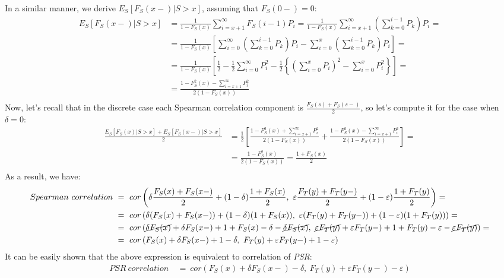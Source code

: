 \documentclass[]{article}
\let\epsilon\varepsilon
\begin{document}
In a similar manner, we derive $E_S[F_S(x-)|S>x]$, assuming that $F_S(0-)=0$:
	$$
	\begin{aligned}
		E_S[F_S(x-)|S>x] &= \frac{1}{1-F_S(x)} \sum_{i=x+1}^{\infty}F_S(i-1)P_i = \frac{1}{1-F_S(x)}\sum_{i=x+1}^{\infty}\left( \sum_{k=0}^{i-1}P_k \right)P_i =\\
		 &= \frac{1}{1-F_S(x)}\left[ \sum_{i=0}^{\infty}\left( \sum_{k=0}^{i-1}P_k \right)P_i - \sum_{i=0}^{x}\left( \sum_{k=0}^{i-1}P_k \right)P_i   \right] = \\
		 &= \frac{1}{1-F_S(x)}\left[ \frac{1}{2} - \frac{1}{2}\sum_{i=0}^{\infty}P_i^2 -  \frac{1}{2} \left\{ \left(\sum_{i=0}^{x}P_i\right)^2 - \sum_{i=0}^{x}P_i^2  \right\}    \right] = \\
		 &= \frac{ 1 - F_S^2(x) - \sum_{i=x+1}^{\infty}P_i^2 }{2(1-F_S(x))}\\
	\end{aligned}
	$$
Now, let's recall that in the discrete case each Spearman correlation component is $\frac{F_S(s) + F_S(s-)}{2}$, so let's compute it for the case when $\delta=0$:
	$$
	\begin{aligned}
	  \frac{E_S[F_S(x)|S>x] + E_S[F_S(x-)|S>x]}{2} &= \frac{1}{2}\left[\frac{ 1 - F_S^2(x) + \sum_{i=x+1}^{\infty}P_i^2 }{2(1-F_S(x))}   +   \frac{ 1 - F_S^2(x) - \sum_{i=x+1}^{\infty}P_i^2 }{2(1-F_S(x))}\right]=\\
		&= \frac{1 - F_S^2(x)}{2(1-F_S(x))}= \frac{1 + F_S(x)}{2}\\
	\end{aligned}
	$$
As a result, we have:
	$$
	\begin{aligned}
		Spearman~correlation~&=~ cor\left(  \delta\frac{F_S(x) + F_S(x-)}{2} + (1-\delta) \frac{1 + F_S(x)}{2}, ~\epsilon\frac{F_T(y) + F_T(y-)}{2} + (1-\epsilon) \frac{1 + F_T(y)}{2} \right)=\\
		&=~ cor\left(  \delta( F_S(x) + F_S(x-)) + (1-\delta) (1 + F_S(x)), ~\epsilon (F_T(y) + F_T(y-)) + (1-\epsilon) (1 + F_T(y)) \right)=\\
		&=~ cor\left( \cancel{\delta F_S(x)} + \delta F_S(x-) +  1 + F_S(x) -\delta - \cancel{\delta F_S(x)}, ~\cancel{\epsilon F_T(y)} + \epsilon F_T(y-) + 1 + F_T(y)-\epsilon -\cancel{\epsilon F_T(y)}   \right)=\\
		&=~ cor\left( F_S(x) + \delta F_S(x-) +  1 -\delta , ~ F_T(y) + \epsilon F_T(y-) + 1 -\epsilon   \right)\\
	\end{aligned}
	$$
It can be easily shown that the above expression is equivalent to correlation of \emph{PSR}:
	$$
	\begin{aligned}
		PSR~correlation~&=~ cor\left(  F_S(x) + \delta F_S(x-) -\delta,~F_T(y) + \epsilon F_T(y-) -\epsilon  \right)\\
	\end{aligned}
	$$
\end{document}
